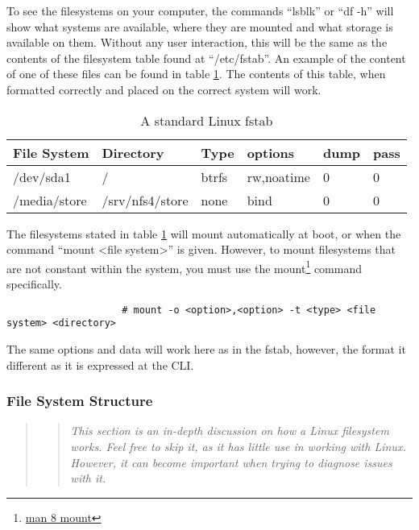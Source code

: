 				To see the filesystems on your computer, the commands ``lsblk'' or ``df -h'' will show what systems are available, where they are mounted and what storage is available on them.
				Without any user interaction, this will be the same as the contents of the filesystem table found at ``/etc/fstab''.
				An example of the content of one of these files can be found in table \ref{tab:fstab}.
				The contents of this table, when formatted correctly and placed on the correct system will work.
				\begin{table}[htb]
					\centering
				\begin{adjustbox}{max width=1\textwidth}
					\begin{tabular}{l l l l l l }
						\toprule
						\textbf{File System} & \textbf{Directory} & \textbf{Type} & \textbf{options} & \textbf{dump} & \textbf{pass} \\
						\toprule
						/dev/sda1 & / & btrfs & rw,noatime & 0 & 0 \\
						/media/store & /srv/nfs4/store & none & bind & 0 & 0 \\
						\bottomrule
					\end{tabular}
				\end{adjustbox}
					\label{tab:fstab}
					\caption{A standard Linux fstab}
				\end{table}
				The filesystems stated in table \ref{tab:fstab} will mount automatically at boot, or when the command ``mount <file system>'' is given.
				However, to mount filesystems that are not constant within the system, you must use the mount\footnote{\href{http://linux.die.net/man/8/mount}{man 8 mount}} command specifically.
				\begin{verbatim}
					# mount -o <option>,<option> -t <type> <file system> <directory>
				\end{verbatim}
				The same options and data will work here as in the fstab, however, the format it different as it is expressed at the CLI.

			\subsubsection{File System Structure}
			\begin{quote}%
				\begin{quote}
				\textit{
				This section is an in-depth discussion on how a Linux filesystem works.
				Feel free to skip it, as it has little use in working with Linux.
				However, it can become important when trying to diagnose issues with it.
				}
				\end{quote}
			\end{quote}

